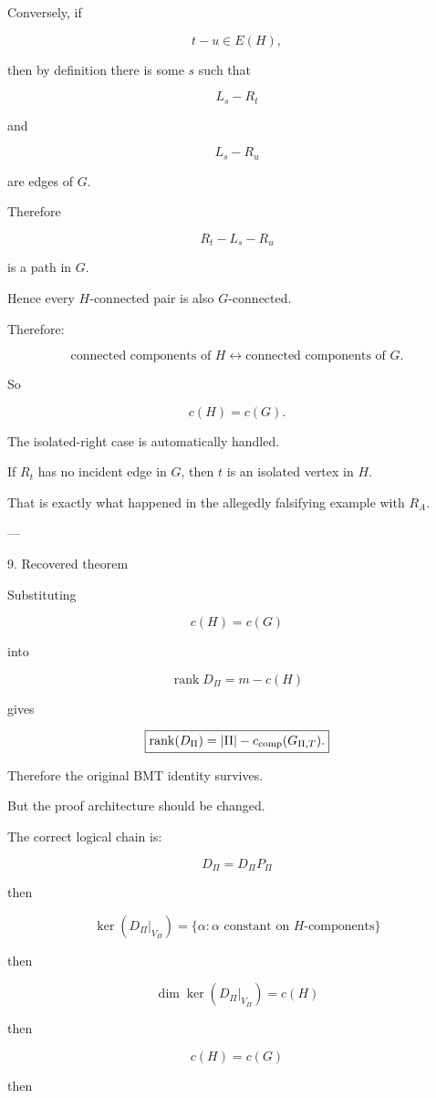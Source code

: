 Conversely, if

\[
t-u\in E(H),
\]

then by definition there is some \(s\) such that

\[
L_s-R_t
\]

and

\[
L_s-R_u
\]

are edges of \(G\).

Therefore

\[
R_t-L_s-R_u
\]

is a path in \(G\).

Hence every \(H\)-connected pair is also \(G\)-connected.

Therefore:

\[
\boxed{
\text{connected components of }H
\longleftrightarrow
\text{connected components of }G.
}
\]

So

\[
\boxed{c(H)=c(G).}
\]

The isolated-right case is automatically handled.

If \(R_t\) has no incident edge in \(G\), then \(t\) is an isolated vertex in \(H\).

That is exactly what happened in the allegedly falsifying example with \(R_A\).


---

9. Recovered theorem

Substituting

\[
c(H)=c(G)
\]

into

\[
\operatorname{rank}D_\Pi=m-c(H)
\]

gives

\[
\boxed{
\operatorname{rank}(D_\Pi)
=
|\Pi|-c_{\rm comp}(G_{\Pi,T}).
}
\]

Therefore the original BMT identity survives.

But the proof architecture should be changed.

The correct logical chain is:

\[
\boxed{
D_\Pi=D_\Pi P_\Pi
}
\]

then

\[
\boxed{
\ker(D_\Pi|_{V_\Pi})
=
\{\alpha:\alpha\text{ constant on }H\text{-components}\}
}
\]

then

\[
\boxed{
\dim\ker(D_\Pi|_{V_\Pi})=c(H)
}
\]

then

\[
\boxed{
c(H)=c(G)
}
\]

then

